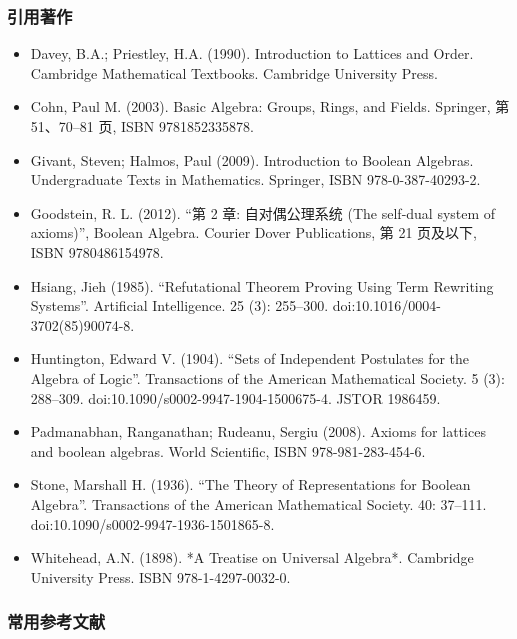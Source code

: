 \subsubsection{引用著作}
\begin{itemize}
\item Davey, B.A.; Priestley, H.A. (1990). Introduction to Lattices and Order. Cambridge Mathematical Textbooks. Cambridge University Press.
\item Cohn, Paul M. (2003). Basic Algebra: Groups, Rings, and Fields. Springer, 第 51、70–81 页, ISBN 9781852335878.
\item Givant, Steven; Halmos, Paul (2009). Introduction to Boolean Algebras. Undergraduate Texts in Mathematics. Springer, ISBN 978-0-387-40293-2.
\item Goodstein, R. L. (2012). “第 2 章: 自对偶公理系统 (The self-dual system of axioms)”, Boolean Algebra. Courier Dover Publications, 第 21 页及以下, ISBN 9780486154978.
\item Hsiang, Jieh (1985). “Refutational Theorem Proving Using Term Rewriting Systems”. Artificial Intelligence. 25 (3): 255–300. doi:10.1016/0004-3702(85)90074-8.
\item Huntington, Edward V. (1904). “Sets of Independent Postulates for the Algebra of Logic”. Transactions of the American Mathematical Society. 5 (3): 288–309. doi:10.1090/s0002-9947-1904-1500675-4. JSTOR 1986459.
\item Padmanabhan, Ranganathan; Rudeanu, Sergiu (2008). Axioms for lattices and boolean algebras. World Scientific, ISBN 978-981-283-454-6.
\item Stone, Marshall H. (1936). “The Theory of Representations for Boolean Algebra”. Transactions of the American Mathematical Society. 40: 37–111. doi:10.1090/s0002-9947-1936-1501865-8.
\item Whitehead, A.N. (1898). *A Treatise on Universal Algebra*. Cambridge University Press. ISBN 978-1-4297-0032-0.
\end{itemize}
\subsubsection{常用参考文献}